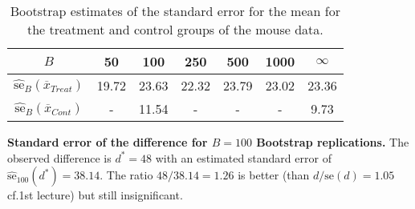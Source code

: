 
\begin{table}[!h]
\begin{tabular}{ccccccc}
$B$ &  50   &  100 & 250   & 500 & 1000 & $\infty$ \\
\hline
$\hat{\mathrm{se}}_{B} (\overline{x}_{Treat})$  & 19.72 & 23.63 & 22.32 & 23.79 & 23.02 & 23.36 \\
$\hat{\mathrm{se}}_{B} (\overline{x}_{Cont})$  & - & 11.54 & - & - & - & 9.73 \\
 \end{tabular}
\caption{Bootstrap estimates of the standard error for the mean  for the treatment and control groups of the mouse data.}
\end{table} 

\textbf{Standard error of the difference for $B=100$ Bootstrap replications.}
The observed difference is $d^{*}=48$ with an estimated standard error of $\widehat{\mathrm{se}}_{100}(d^*)=38.14$.
The ratio $48/38.14=1.26$ is better (than $d/\mathrm{se}(d)=1.05$ cf.1st lecture) but still insignificant. 


